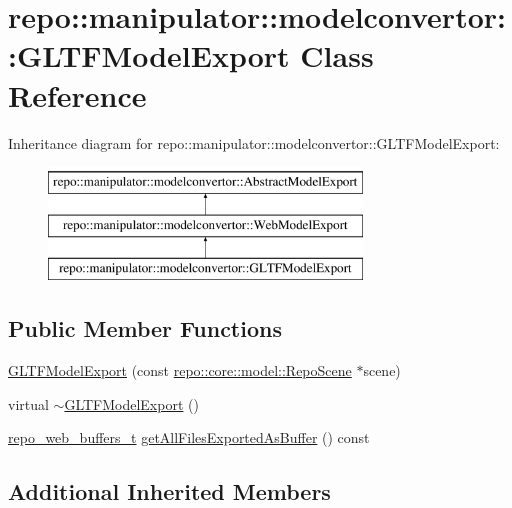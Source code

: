 \hypertarget{classrepo_1_1manipulator_1_1modelconvertor_1_1_g_l_t_f_model_export}{}\section{repo\+:\+:manipulator\+:\+:modelconvertor\+:\+:G\+L\+T\+F\+Model\+Export Class Reference}
\label{classrepo_1_1manipulator_1_1modelconvertor_1_1_g_l_t_f_model_export}
Inheritance diagram for repo\+:\+:manipulator\+:\+:modelconvertor\+:\+:G\+L\+T\+F\+Model\+Export\+:\begin{figure}[H]
\begin{center}
\leavevmode
\includegraphics[height=3.000000cm]{classrepo_1_1manipulator_1_1modelconvertor_1_1_g_l_t_f_model_export}
\end{center}
\end{figure}
\subsection*{Public Member Functions}
\begin{DoxyCompactItemize}
\item 
\hyperlink{classrepo_1_1manipulator_1_1modelconvertor_1_1_g_l_t_f_model_export_a11dfb0019a718133d1848f273b44aa09}{G\+L\+T\+F\+Model\+Export} (const \hyperlink{classrepo_1_1core_1_1model_1_1_repo_scene}{repo\+::core\+::model\+::\+Repo\+Scene} $\ast$scene)
\item 
virtual \hyperlink{classrepo_1_1manipulator_1_1modelconvertor_1_1_g_l_t_f_model_export_a1c641b8c048ce68454409e5b6cb232e9}{$\sim$\+G\+L\+T\+F\+Model\+Export} ()
\item 
\hyperlink{structrepo__web__buffers__t}{repo\+\_\+web\+\_\+buffers\+\_\+t} \hyperlink{classrepo_1_1manipulator_1_1modelconvertor_1_1_g_l_t_f_model_export_af46ede52b996784ab8b7ff15977d186d}{get\+All\+Files\+Exported\+As\+Buffer} () const 
\end{DoxyCompactItemize}
\subsection*{Additional Inherited Members}



